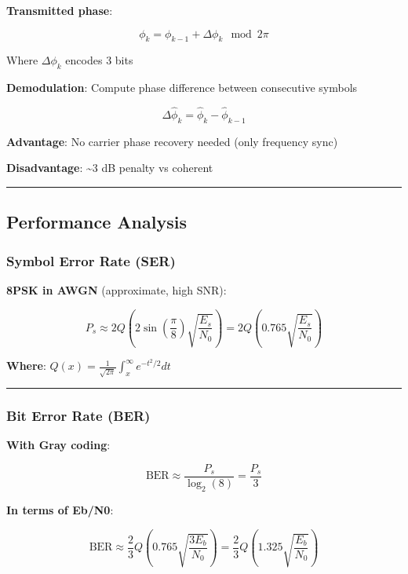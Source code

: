 \textbf{Transmitted phase}:

\[
\phi_k = \phi_{k-1} + \Delta\phi_k \mod 2\pi
\]

Where \(\Delta\phi_k\) encodes 3 bits

\textbf{Demodulation}: Compute phase difference between consecutive
symbols

\[
\Delta\hat{\phi}_k = \hat{\phi}_k - \hat{\phi}_{k-1}
\]

\textbf{Advantage}: No carrier phase recovery needed (only frequency
sync)

\textbf{Disadvantage}: \textasciitilde3 dB penalty vs coherent

\begin{center}\rule{0.5\linewidth}{0.5pt}\end{center}

\subsection{Performance Analysis}\label{performance-analysis}

\subsubsection{Symbol Error Rate (SER)}\label{symbol-error-rate-ser}

\textbf{8PSK in AWGN} (approximate, high SNR):

\[
P_s \approx 2Q\left(2\sin\left(\frac{\pi}{8}\right)\sqrt{\frac{E_s}{N_0}}\right) = 2Q\left(0.765\sqrt{\frac{E_s}{N_0}}\right)
\]

\textbf{Where}:
\(Q(x) = \frac{1}{\sqrt{2\pi}} \int_x^\infty e^{-t^2/2} dt\)

\begin{center}\rule{0.5\linewidth}{0.5pt}\end{center}

\subsubsection{Bit Error Rate (BER)}\label{bit-error-rate-ber}

\textbf{With Gray coding}:

\[
\text{BER} \approx \frac{P_s}{\log_2(8)} = \frac{P_s}{3}
\]

\textbf{In terms of Eb/N0}:

\[
\text{BER} \approx \frac{2}{3}Q\left(0.765\sqrt{\frac{3E_b}{N_0}}\right) = \frac{2}{3}Q\left(1.325\sqrt{\frac{E_b}{N_0}}\right)
\]

